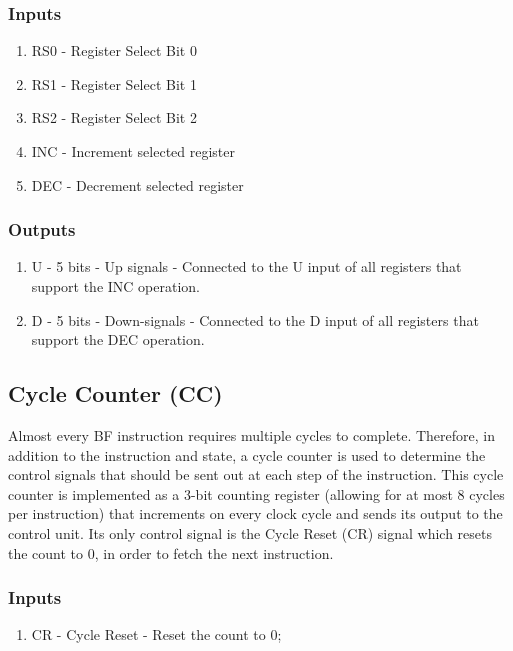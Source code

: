 \subsubsection*{Inputs}
\begin{enumerate}
  \itemsep0em
\item RS0 - Register Select Bit 0
\item RS1 - Register Select Bit 1
\item RS2 - Register Select Bit 2
\item INC - Increment selected register
\item DEC - Decrement selected register
\end{enumerate}

\subsubsection*{Outputs}
\begin{enumerate}
\itemsep0em 
\item U - 5 bits - Up signals - Connected to the U input of all registers that support the INC operation.
\item D - 5 bits - Down-signals - Connected to the D input of all registers that support the DEC operation.
\end{enumerate}


\subsection{Cycle Counter (CC)} \label{sec:architecture:cc}
Almost every BF instruction requires multiple cycles to complete. Therefore, in addition to the instruction and state, a cycle counter is used to determine the control signals that should be sent out at each step of the instruction. This cycle counter is implemented as a 3-bit counting register (allowing for at most 8 cycles per instruction) that increments on every clock cycle and sends its output to the control unit. Its only control signal is the Cycle Reset (CR) signal which resets the count to 0, in order to fetch the next instruction.

\subsubsection*{Inputs}
\begin{enumerate}
\itemsep0em
\item CR - Cycle Reset - Reset the count to 0;
\end{enumerate}

